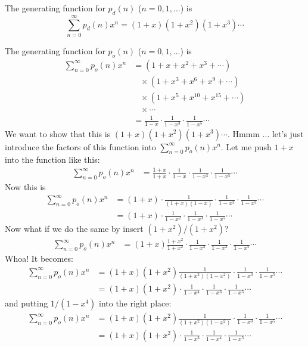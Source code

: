 The generating function for $p_d(n)$ ($n=0,1,...$) is
\[
\sum_{n=0}^\infty p_d(n) x^n
= (1 + x) (1 + x^2) (1 + x^3) \cdots
\]

The generating function for $p_o(n)$ ($n=0,1,...$) is
\begin{align*}
\sum_{n=0}^\infty p_o(n) x^n 
&= (1 + x + x^2 + x^3 + \cdots ) \\
& \,\,\,\,\, \times (1 + x^3 + x^6 + x^9 + \cdots ) \\
& \,\,\,\,\, \times (1 + x^5 + x^{10} + x^{15} + \cdots ) \\
& \,\,\,\,\, \times \cdots \\
&= \frac{1}{1 - x} \cdot \frac{1}{1 - x^3} \cdot\frac{1}{1 - x^5} \cdots 
\end{align*}
We want to show that this is $(1 + x) (1 + x^2) (1 + x^3) \cdots$.
Hmmm ... let's just introduce the factors of this function into $\sum_{n=0}^\infty p_o(n)x^n$.
Let me push $1+x$ into the function like this:
\begin{align*}
\sum_{n=0}^\infty p_o(n) x^n 
&= \frac{1+x}{1+x} \cdot \frac{1}{1 - x} \cdot \frac{1}{1 - x^3} \cdot\frac{1}{1 - x^5} \cdots 
\end{align*}
Now this is
\begin{align*}
\sum_{n=0}^\infty p_o(n) x^n 
&= (1+x) \cdot \frac{1}{(1+x)(1-x)} \cdot \frac{1}{1 - x^3} \cdot\frac{1}{1 - x^5} \cdots \\ 
&= (1+x) \cdot \frac{1}{1 - x^2} \cdot \frac{1}{1 - x^3} \cdot\frac{1}{1 - x^5} \cdots 
\end{align*}
Now what if we do the same by insert $(1+x^2)/(1+x^2)$?
\begin{align*}
\sum_{n=0}^\infty p_o(n) x^n 
&= (1+x) \frac{1+x^2}{1+x^2}\cdot \frac{1}{1 - x^2} \cdot \frac{1}{1 - x^3} \cdot\frac{1}{1 - x^5} \cdots 
\end{align*}
Whoa! It becomes:
\begin{align*}
\sum_{n=0}^\infty p_o(n) x^n 
&= (1+x)(1+x^2) \frac{1}{(1+x^2)(1 - x^2)} \cdot \frac{1}{1 - x^3} \cdot\frac{1}{1 - x^5} \cdots \\
&= (1+x)(1+x^2) \cdot \frac{1}{1 - x^4} \cdot \frac{1}{1 - x^3} \cdot\frac{1}{1 - x^5} \cdots 
\end{align*}
and putting $1/(1-x^4)$ into the right place:
\begin{align*}
\sum_{n=0}^\infty p_o(n) x^n 
&= (1+x)(1+x^2) \frac{1}{(1+x^2)(1 - x^2)} \cdot \frac{1}{1 - x^3} \cdot\frac{1}{1 - x^5} \cdots \\
&= (1+x)(1+x^2) \cdot  \frac{1}{1 - x^3} \cdot \frac{1}{1 - x^4} \cdot \frac{1}{1 - x^5} \cdots 
\end{align*}
